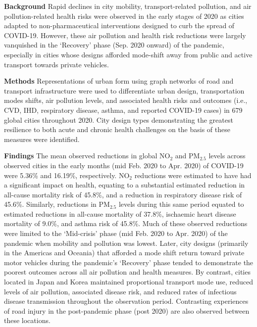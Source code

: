 \documentclass[preprint,10pt]{elsarticle} %
\newcommand{\absdiv}[1]{%
  \par\addvspace{.5\baselineskip}%
  \noindent\textbf{#1}\quad\ignorespaces}
\begin{document}


 \absdiv{\textcolor{OliveGreen}{Background}}
Rapid declines in city mobility, transport-related pollution, and air pollution-related health risks were observed in the early stages of 2020 as cities adapted to non-pharmaceutical interventions designed to curb the spread of COVID-19. However, these air pollution and health risk reductions were largely vanquished in the `Recovery' phase (Sep. 2020 onward) of the pandemic, especially in cities whose designs afforded mode-shift away from public and active transport towards private vehicles. 
 \absdiv{\textcolor{OliveGreen}{Methods}}
Representations of urban form using graph networks of road and transport infrastructure were used to differentiate urban design, transportation modes shifts, air pollution levels, and associated health risks and outcomes (i.e., CVD, IHD, respiratory disease, asthma, and reported COVID-19 cases) in 679 global cities throughout 2020. City design types demonstrating the greatest resilience to both acute and chronic health challenges on the basis of these measures were identified.
 \absdiv{\textcolor{OliveGreen}{Findings}}
The mean observed reductions in global NO$_{2}$ and PM$_{2.5}$ levels across observed cities in the early months (mid Feb. 2020 to Apr. 2020) of COVID-19 were 5.36\% and 16.19\%, respectively. NO$_{2}$ reductions were estimated to have had a significant impact on health, equating to a substantial estimated reduction in all-cause mortality risk of 45.8\%, and a reduction in respiratory disease risk of 45.6\%. Similarly, reductions in PM$_{2.5}$ levels during this same period equated to estimated reductions in all-cause mortality of 37.8\%, ischaemic heart disease mortality of 9.0\%, and asthma risk of 45.8\%. Much of these observed reductions were limited to the `Mid-crisis' phase (mid Feb. 2020 to Apr. 2020) of the pandemic when mobility and pollution was lowest. Later, city designs (primarily in the Americas and Oceania) that afforded a mode shift return toward private motor vehicles during the pandemic's `Recovery' phase tended to demonstrate the poorest outcomes across all air pollution and health measures. By contrast, cities located in Japan and Korea maintained proportional transport mode use, reduced levels of air pollution, associated disease risk, and reduced rates of infectious disease transmission throughout the observation period. Contrasting experiences of road injury in the post-pandemic phase (post 2020) are also observed between these locations. 
\end{document}
